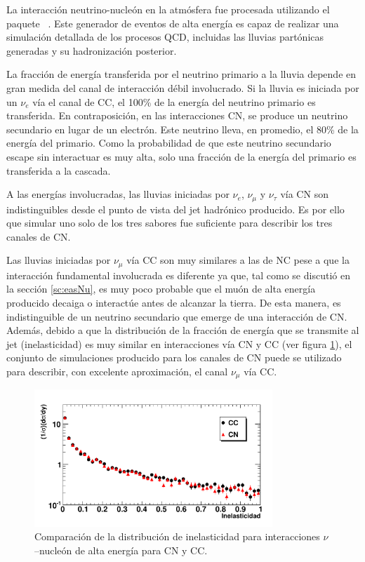 	La interacción neutrino-nucleón en la atm\'osfera fue procesada utilizando el paquete \herwig{}~\cite{cite:herwig}.
	Este generador de eventos de alta energía es capaz de realizar una simulación detallada de los procesos QCD, incluidas las lluvias partónicas generadas y su hadronización posterior.

	La fracción de energía transferida por el neutrino primario a la lluvia depende en gran medida del canal de interacción débil involucrado.
	Si la lluvia es iniciada por un $\nu_e$ vía el canal de CC, el 100\% de la energía del neutrino primario es transferida.
	En contraposición, en las interacciones CN, se produce un neutrino secundario en lugar de un electrón. Este neutrino lleva, en promedio, el 80\% de la energía del primario.
	Como la probabilidad de que este neutrino secundario escape sin interactuar es muy alta, solo una fracción de la energía del primario es transferida a la cascada. 

	A las energías involucradas, las lluvias iniciadas por $\nu_e$, $\nu_{\mu}$ y $\nu_{\tau}$ vía CN son indistinguibles desde el punto de vista del jet hadrónico producido.
	Es por ello que simular uno solo de los tres sabores fue suficiente para describir los tres canales de CN.

	Las lluvias iniciadas por $\nu_{\mu}$ vía CC son muy similares a las de NC pese a que la interacción fundamental involucrada es diferente ya que, tal como se discuti\'o en la sección \ref{sc:easNu}, es muy poco probable que el muón de alta energía producido decaiga o interactúe antes de alcanzar la tierra.
	De esta manera, es indistinguible de un neutrino secundario que emerge de una interacción de CN. 
	Además, debido a que la distribución de la fracción de energía que se transmite al jet (inelasticidad) es muy similar en interacciones vía CN y CC  (ver figura \ref{fig:inelast}), el conjunto de simulaciones producido para los canales de CN puede se utilizado para describir, con excelente aproximación, el canal $\nu_{\mu}$ vía CC.
	\begin{figure}[ht]
	\begin{center}
	\includegraphics[width=0.80\textwidth]{fig/simulacionAuger/Inelasticity}
	\caption{Comparación de la distribución de inelasticidad para interacciones $\nu$--nucleón de alta energía para CN y CC.}
	\label{fig:inelast}
	\end{center}
	\end{figure}

